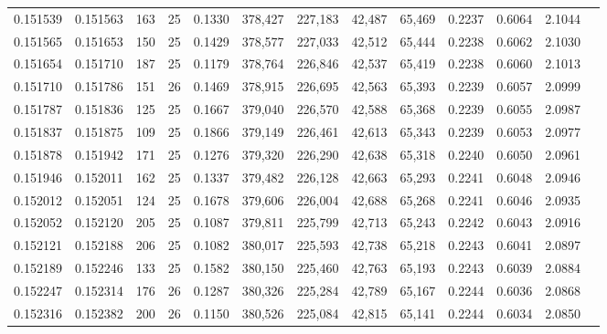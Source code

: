 \begin{tabular}{rrrrrrrrrrrrr}
0.151539 & 0.151563 & 163 &  25 &                                     0.1330 & 378,427 & 227,183 &  42,487 &  65,469 & 0.2237 & 0.6064 & 2.1044 \\
0.151565 & 0.151653 & 150 &  25 &                                     0.1429 & 378,577 & 227,033 &  42,512 &  65,444 & 0.2238 & 0.6062 & 2.1030 \\
0.151654 & 0.151710 & 187 &  25 &                                     0.1179 & 378,764 & 226,846 &  42,537 &  65,419 & 0.2238 & 0.6060 & 2.1013 \\
0.151710 & 0.151786 & 151 &  26 &                                     0.1469 & 378,915 & 226,695 &  42,563 &  65,393 & 0.2239 & 0.6057 & 2.0999 \\
0.151787 & 0.151836 & 125 &  25 &                                     0.1667 & 379,040 & 226,570 &  42,588 &  65,368 & 0.2239 & 0.6055 & 2.0987 \\
0.151837 & 0.151875 & 109 &  25 &                                     0.1866 & 379,149 & 226,461 &  42,613 &  65,343 & 0.2239 & 0.6053 & 2.0977 \\
0.151878 & 0.151942 & 171 &  25 &                                     0.1276 & 379,320 & 226,290 &  42,638 &  65,318 & 0.2240 & 0.6050 & 2.0961 \\
0.151946 & 0.152011 & 162 &  25 &                                     0.1337 & 379,482 & 226,128 &  42,663 &  65,293 & 0.2241 & 0.6048 & 2.0946 \\
0.152012 & 0.152051 & 124 &  25 &                                     0.1678 & 379,606 & 226,004 &  42,688 &  65,268 & 0.2241 & 0.6046 & 2.0935 \\
0.152052 & 0.152120 & 205 &  25 &                                     0.1087 & 379,811 & 225,799 &  42,713 &  65,243 & 0.2242 & 0.6043 & 2.0916 \\
0.152121 & 0.152188 & 206 &  25 &                                     0.1082 & 380,017 & 225,593 &  42,738 &  65,218 & 0.2243 & 0.6041 & 2.0897 \\
0.152189 & 0.152246 & 133 &  25 &                                     0.1582 & 380,150 & 225,460 &  42,763 &  65,193 & 0.2243 & 0.6039 & 2.0884 \\
0.152247 & 0.152314 & 176 &  26 &                                     0.1287 & 380,326 & 225,284 &  42,789 &  65,167 & 0.2244 & 0.6036 & 2.0868 \\
0.152316 & 0.152382 & 200 &  26 &                                     0.1150 & 380,526 & 225,084 &  42,815 &  65,141 & 0.2244 & 0.6034 & 2.0850 \\

\end{tabular}
